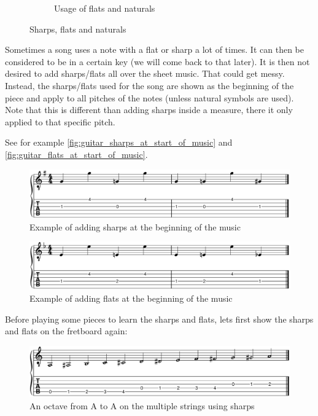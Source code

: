 \begin{figure}[h]
\begin{subfigure}[b]{0.45\textwidth}
		\caption{Usage of flats and naturals}
		\label{fig:guitar_usage_of_flats_and_naturals}
	\end{subfigure}
	\caption{Sharps, flats and naturals}
\end{figure}

Sometimes a song uses a note with a flat or sharp a lot of times. It can then be considered to be in a certain key (we will come back to that later). It is then not desired to add sharps/flats all over the sheet music. That could get messy. Instead, the sharps/flats used for the song are shown as the beginning of the piece and apply to all pitches of the notes (unless natural symbols are used). Note that this is different than adding sharps inside a measure, there it only applied to that specific pitch.

See for example \autoref{fig:guitar_sharps_at_start_of_music} and \autoref{fig:guitar_flats_at_start_of_music}.

\begin{figure}[h]
	\centering
	\includegraphics[width=\textwidth]{../../MuseScore/Guitar/GuitarKeySharpExample.png}
	\caption{Example of adding sharps at the beginning of the music}
	\label{fig:guitar_sharps_at_start_of_music}
\end{figure}

\begin{figure}[h]
	\centering
	\includegraphics[width=\textwidth]{../../MuseScore/Guitar/GuitarKeyFlatExample.png}
	\caption{Example of adding flats at the beginning of the music}
	\label{fig:guitar_flats_at_start_of_music}
\end{figure}

\newpage

Before playing some pieces to learn the sharps and flats, lets first show the sharps and flats on the fretboard again:

\begin{figure}[h]
	\centering
	\includegraphics[width=\textwidth]{../../MuseScore/Guitar/PitchesSharpsMultiString.png}
	\caption{An octave from A to A on the multiple strings using sharps}
	\label{fig:guitar_string_a_octave_multi_string_sharps_chap_music_notation}
\end{figure}

